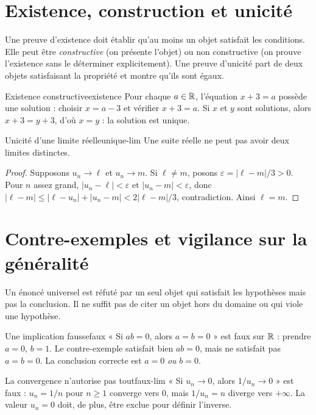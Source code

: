 \section{Existence, construction et unicité}
Une preuve d'existence doit établir qu'au moins un objet satisfait les conditions. Elle peut être \emph{constructive} (on présente l'objet) ou non constructive (on prouve l'existence sans le déterminer explicitement). Une preuve d'unicité part de deux objets satisfaisant la propriété et montre qu'ils sont égaux.

\begin{exemple}{Existence constructive}{existence}
Pour chaque $a\in\mathbb R$, l'équation $x+3=a$ possède une solution : choisir $x=a-3$ et vérifier $x+3=a$. Si $x$ et $y$ sont solutions, alors $x+3=y+3$, d'où $x=y$ : la solution est unique.
\end{exemple}
\begin{proposition}{Unicité d'une limite réelle}{unique-lim}
Une suite réelle ne peut pas avoir deux limites distinctes.
\end{proposition}
\begin{proof}
Supposons $u_n\to\ell$ et $u_n\to m$. Si $\ell\ne m$, posons $\varepsilon=|\ell-m|/3>0$. Pour $n$ assez grand, $|u_n-\ell|<\varepsilon$ et $|u_n-m|<\varepsilon$, donc $|\ell-m|\le|\ell-u_n|+|u_n-m|<2|\ell-m|/3$, contradiction. Ainsi $\ell=m$.
\end{proof}

\section{Contre-exemples et vigilance sur la généralité}
Un énoncé universel est réfuté par un seul objet qui satisfait les hypothèses mais pas la conclusion. Il ne suffit pas de citer un objet hors du domaine ou qui viole une hypothèse.
\begin{contreexemple}{Une implication fausse}{faux}
« Si $ab=0$, alors $a=b=0$ » est faux sur $\mathbb R$ : prendre $a=0$, $b=1$. Le contre-exemple satisfait bien $ab=0$, mais ne satisfait pas $a=b=0$. La conclusion correcte est $a=0$ \emph{ou} $b=0$.
\end{contreexemple}
\begin{contreexemple}{La convergence n'autorise pas tout}{faux-lim}
« Si $u_n\to0$, alors $1/u_n\to0$ » est faux : $u_n=1/n$ pour $n\ge1$ converge vers $0$, mais $1/u_n=n$ diverge vers $+\infty$. La valeur $u_n=0$ doit, de plus, être exclue pour définir l'inverse.
\end{contreexemple}

